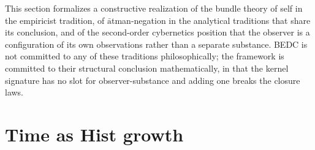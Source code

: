 \begin{remark}[Reading]
\label{rem:observer-as-bundle}
This section formalizes a constructive realization of the bundle theory of self in the empiricist tradition, of \(\bar{\text{a}}\)tman-negation in the analytical traditions that share its conclusion, and of the second-order cybernetics position that the observer is a configuration of its own observations rather than a separate substance. BEDC is not committed to any of these traditions philosophically; the framework is committed to their structural conclusion mathematically, in that the kernel signature has no slot for observer-substance and adding one breaks the closure laws.
\end{remark}

\section{Time as Hist growth}
\label{sec:observer-time-as-growth}

